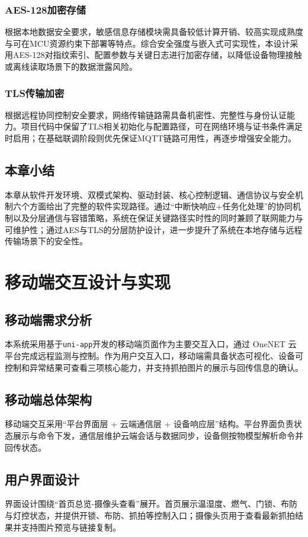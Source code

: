 \documentclass[UTF8,12pt,a4paper,oneside]{ctexbook}
\numberwithin{equation}{chapter}
\begin{document}
\subsection{AES-128加密存储}
根据本地数据安全要求，敏感信息存储模块需具备较低计算开销、较高实现成熟度与可在MCU资源约束下部署等特点。综合安全强度与嵌入式可实现性，本设计采用AES-128对指纹索引、配置参数与关键日志进行加密存储，以降低设备物理接触或离线读取场景下的数据泄露风险\cite{aes_fips197}。
\subsection{TLS传输加密}
根据远程协同控制安全要求，网络传输链路需具备机密性、完整性与身份认证能力。项目代码中保留了TLS相关初始化与配置路径，可在网络环境与证书条件满足时启用；在基础联调阶段则优先保证MQTT链路可用性，再逐步增强安全能力\cite{rfc5246,tls_rfc}。

\section{本章小结}
本章从软件开发环境、双模式架构、驱动封装、核心控制逻辑、通信协议与安全机制六个方面给出了完整的软件实现路径。通过“中断快响应+任务化处理”的协同机制以及分层通信与容错策略，系统在保证关键路径实时性的同时兼顾了联网能力与可维护性；通过AES与TLS的分层防护设计，进一步提升了系统在本地存储与远程传输场景下的安全性。

\chapter{移动端交互设计与实现}
\section{移动端需求分析}
本系统采用基于\texttt{uni-app}开发的移动端页面作为主要交互入口，通过 OneNET 云平台完成远程监测与控制。作为用户交互入口，移动端需具备状态可视化、设备可控制和异常结果可查看三项核心能力，并支持抓拍图片的展示与回传信息的确认。
\section{移动端总体架构}
移动端交互采用“平台界面层 + 云端通信层 + 设备响应层”结构。平台界面负责状态展示与命令下发，通信层维护云端会话与数据同步，设备侧按物模型解析命令并回传状态\cite{mqtt_iot_review}。
\section{用户界面设计}
界面设计围绕“首页总览-摄像头查看”展开。首页展示温湿度、燃气、门锁、布防与灯控状态，并提供开锁、布防、抓拍等控制入口；摄像头页用于查看最新抓拍结果并支持图片预览与链接复制。
\end{document}

